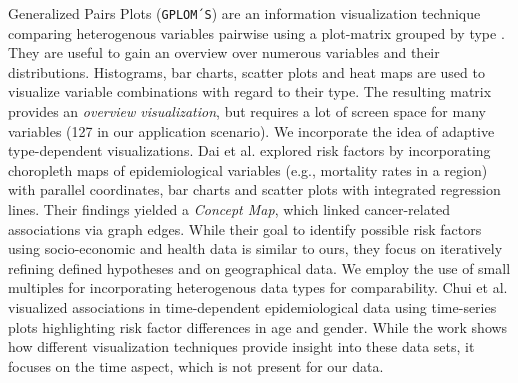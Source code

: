 \documentclass[journal]{style/vgtc} 			          %
\newcommand{\add}[1]{\textcolor{blue}{\uline{#1}}}
\begin{document}
Generalized Pairs Plots (\texttt{GPLOM´S}) are an information visualization technique comparing heterogenous variables pairwise using a plot-matrix grouped by type \cite{GPLOMS, Francois2013}.
%
They are useful to gain an overview over numerous variables and their distributions.
%
Histograms, bar charts, scatter plots and heat maps are used to visualize variable combinations with regard to their type.
%
The resulting matrix provides an \emph{overview visualization}, but requires a lot of screen space for many variables (127 in our application scenario).
%
%
%
We incorporate the idea of adaptive type-dependent visualizations.
%
Dai et al. \cite{Dai2005} explored risk factors by incorporating choropleth maps of epidemiological variables (e.g., mortality rates in a region) with parallel coordinates, bar charts and scatter plots with integrated regression lines.
%
Their findings yielded a \emph{Concept Map}, which linked cancer-related associations via graph edges.
%
While their goal to identify possible risk factors using socio-economic and health data is similar to ours, they focus on iteratively refining defined hypotheses and on geographical data.
%
We employ the use of small multiples for incorporating heterogenous data types for comparability.
%
Chui et al. \cite{Chui2011} visualized associations in time-dependent epidemiological data using time-series plots highlighting risk factor differences in age and gender.
%
While the work shows how different visualization techniques provide insight into these data sets, it focuses on the time aspect, which is not present for our data.
%
\end{document}
